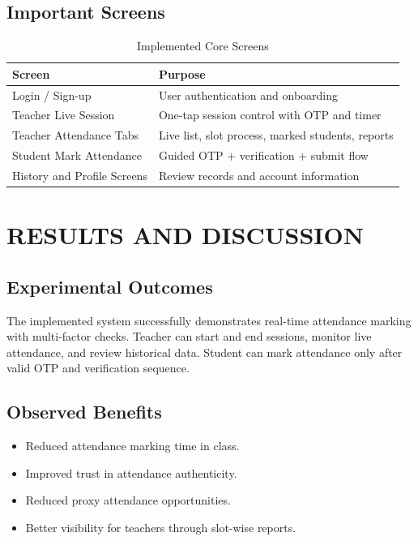 \documentclass[12pt,a4paper]{report}
\begin{document}
\section{Important Screens}
\begin{table}[H]
\centering
\caption{Implemented Core Screens}
\begin{tabular}{p{}p{}}
\toprule
\textbf{Screen} & \textbf{Purpose} \\
\midrule
Login / Sign-up & User authentication and onboarding \\
Teacher Live Session & One-tap session control with OTP and timer \\
Teacher Attendance Tabs & Live list, slot process, marked students, reports \\
Student Mark Attendance & Guided OTP + verification + submit flow \\
History and Profile Screens & Review records and account information \\
\bottomrule
\end{tabular}
\end{table}

\chapter{RESULTS AND DISCUSSION}
\section{Experimental Outcomes}
The implemented system successfully demonstrates real-time attendance marking with multi-factor checks. Teacher can start and end sessions, monitor live attendance, and review historical data. Student can mark attendance only after valid OTP and verification sequence.

\section{Observed Benefits}
\begin{itemize}[leftmargin=1.5cm]
\item Reduced attendance marking time in class.
\item Improved trust in attendance authenticity.
\item Reduced proxy attendance opportunities.
\item Better visibility for teachers through slot-wise reports.
\end{itemize}
\end{document}

